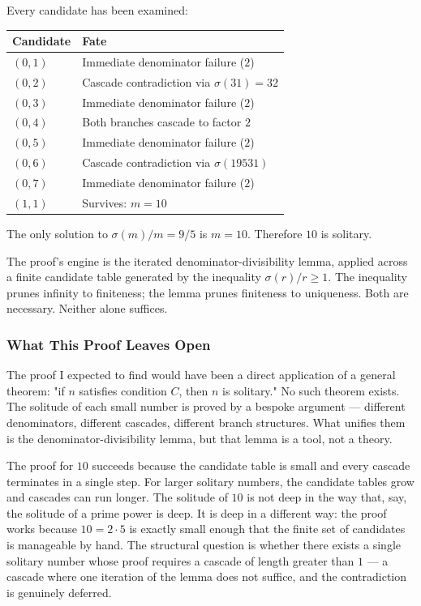 \documentclass[12pt,a4paper]{article}
\begin{document}
    Every candidate has been examined:

    \begin{table}[htbp]
    \centering
    \small
    \begin{tabularx}{\textwidth}{>{\centering\arraybackslash}X >{\centering\arraybackslash}X}
    \toprule
    \rowcolor{gray!25}\textbf{Candidate} & \textbf{Fate} \\
    \midrule
    \rowcolors{1}{white}{gray!10}
    $(0,1)$ & Immediate denominator failure ($2$) \\
    $(0,2)$ & Cascade contradiction via $\sigma(31)=32$ \\
    $(0,3)$ & Immediate denominator failure ($2$) \\
    $(0,4)$ & Both branches cascade to factor $2$ \\
    $(0,5)$ & Immediate denominator failure ($2$) \\
    $(0,6)$ & Cascade contradiction via $\sigma(19531)$ \\
    $(0,7)$ & Immediate denominator failure ($2$) \\
    $(1,1)$ & Survives: $m = 10$ \\
    \bottomrule
    \end{tabularx}
    \end{table}

    The only solution to $\sigma(m)/m = 9/5$ is $m = 10$. Therefore $10$ is solitary.

    The proof's engine is the iterated denominator-divisibility lemma, applied across a finite candidate table generated by the inequality $\sigma(r)/r \ge 1$. The inequality prunes infinity to finiteness; the lemma prunes finiteness to uniqueness. Both are necessary. Neither alone suffices.

    \subsubsection{What This Proof Leaves Open}

    The proof I expected to find would have been a direct application of a general theorem: "if $n$ satisfies condition $C$, then $n$ is solitary." No such theorem exists. The solitude of each small number is proved by a bespoke argument --- different denominators, different cascades, different branch structures. What unifies them is the denominator-divisibility lemma, but that lemma is a tool, not a theory.

    The proof for $10$ succeeds because the candidate table is small and every cascade terminates in a single step. For larger solitary numbers, the candidate tables grow and cascades can run longer. The solitude of $10$ is not deep in the way that, say, the solitude of a prime power is deep. It is deep in a different way: the proof works because $10 = 2 \cdot 5$ is exactly small enough that the finite set of candidates is manageable by hand. The structural question is whether there exists a single solitary number whose proof requires a cascade of length greater than $1$ --- a cascade where one iteration of the lemma does not suffice, and the contradiction is genuinely deferred.
\end{document}
